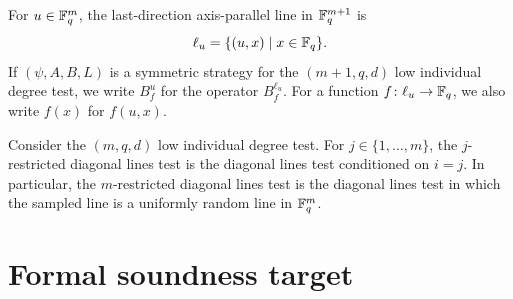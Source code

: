 \begin{definition}\label{not:conditioned-on-last-direction}
	\leanok
	For $u \in \mathbb{F}_q^m$, the last-direction axis-parallel line in $\mathbb{F}_q^{m+1}$ is
	\[
		\ell_u = \{(u,x) \mid x \in \mathbb{F}_q\}.
	\]
	If $(\psi,A,B,L)$ is a symmetric strategy for the $(m+1,q,d)$ low individual degree test, we write $B_f^u$ for the operator $B_f^{\ell_u}$. For a function $f \colon \ell_u \to \mathbb{F}_q$, we also write $f(x)$ for $f(u,x)$.
\end{definition}

\begin{definition}\label{def:restricted-diagonal-lines-test}
	\leanok
	Consider the $(m,q,d)$ low individual degree test. For $j \in \{1,\dots,m\}$, the $j$-restricted diagonal lines test is the diagonal lines test conditioned on $i=j$. In particular, the $m$-restricted diagonal lines test is the diagonal lines test in which the sampled line is a uniformly random line in $\mathbb{F}_q^m$.
\end{definition}

\section{Formal soundness target}

